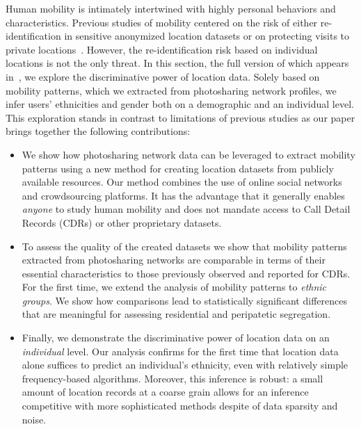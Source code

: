 Human mobility is intimately intertwined with highly personal behaviors and characteristics. 
Previous studies of mobility centered on the risk of either re-identification in sensitive anonymized location datasets or on protecting visits to private locations~\cite{de2013unique,Guha:2012ws}.
However, the re-identification risk based on individual locations is not the only threat. 
In this section, the full version of which appears in~\cite{riederer2015cosn}, we explore the discriminative power of location data. Solely based on mobility patterns, which we extracted from photosharing network profiles, we infer users' ethnicities and gender both on a demographic and an individual level. This exploration stands in contrast to limitations of previous studies as our paper brings together the following contributions:
\begin{itemize}
  \item We show how photosharing network data can be leveraged to extract mobility patterns using a new method for creating location datasets from publicly available resources. Our method combines the use of online social networks and crowdsourcing platforms. It has the advantage that it generally enables \emph{anyone} to study human mobility and does not mandate access to Call Detail Records (CDRs) or other proprietary datasets.
  \item To assess the quality of the created datasets we show that mobility patterns extracted from photosharing networks are comparable in terms of their essential characteristics to those previously observed and reported for CDRs. For the first time, we extend the analysis of mobility patterns to \emph{ethnic groups}. We show how comparisons lead to statistically significant differences that are meaningful for assessing residential and peripatetic segregation.
  \item Finally, we demonstrate the discriminative power of location data on an \emph{individual} level. Our analysis confirms for the first time that location data alone suffices to predict an individual's ethnicity, even with relatively simple frequency-based algorithms. Moreover, this inference is robust: a small amount of location records at a coarse grain allows for an inference competitive with more sophisticated methods despite of data sparsity and noise.
\end{itemize}

